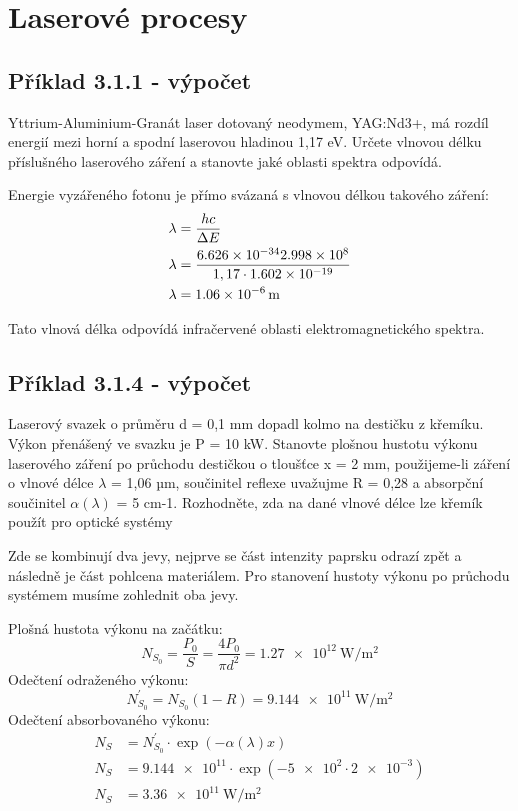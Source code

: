 \section{Laserové procesy}

\subsection{Příklad 3.1.1 - výpočet}
\begin{zadani}
    Yttrium-Aluminium-Granát laser dotovaný neodymem, YAG:Nd3+, 
    má rozdíl energií mezi horní a spodní laserovou hladinou 1,17 eV. 
    Určete vlnovou délku příslušného laserového záření a stanovte
    jaké oblasti spektra odpovídá.
\end{zadani}


Energie vyzářeného fotonu je přímo svázaná s vlnovou délkou takového záření:
\begin{align*}
  \lambda &= \frac{hc}{\Delta E} \\
  \lambda &= \frac{\num{6.626e-34}\num{2.998e8}}{1,17\cdot \num{1.602e-19}} \\
  \lambda &= \qty{1,06e-6}{\meter}
\end{align*}

Tato vlnová délka odpovídá infračervené oblasti elektromagnetického spektra.


\subsection{Příklad 3.1.4 - výpočet}
\begin{zadani}
    Laserový svazek o průměru d = 0,1 mm  dopadl kolmo na destičku z
    křemíku. Výkon přenášený ve svazku je P = 10 kW.  Stanovte plošnou 
    hustotu výkonu laserového záření po průchodu destičkou o tloušťce 
    x = 2 mm,  použijeme-li záření o vlnové délce \(\lambda\)  = 1,06 µm, součinitel 
    reflexe uvažujme  R = 0,28  a absorpční součinitel \(\alpha(\lambda)\)  = 5 cm-1.
   Rozhodněte, zda na dané vlnové délce lze křemík použít pro optické 
    systémy
\end{zadani}


Zde se kombinují dva jevy, nejprve se část intenzity paprsku odrazí zpět a následně je část pohlcena materiálem. Pro stanovení hustoty výkonu po průchodu systémem musíme zohlednit oba jevy. 

Plošná hustota výkonu na začátku:
\[
    N_{S_{0} } =\frac{P_{0}}{S}=\frac{4P_{0}}{\pi d^2} = \qty{1,27e12}{\watt\per\square\meter} 
\]
Odečtení odraženého výkonu: 
\[
    N_{S_{0} }^\prime = N_{S_{0} } (1-R)=\qty{9,144e11}{\watt\per\square\meter}
\]
Odečtení absorbovaného výkonu: 
\begin{align*}
  N_{S} &= N_{S_{0} }^\prime\cdot \exp(-\alpha(\lambda)x) \\
  N_{S} &= \num{9,144e11}\cdot \exp(-\num{5e2}\cdot \num{2e-3}) \\
  N_{S} &= \qty{3,36e11}{\watt\per\square\meter}
\end{align*}
 
